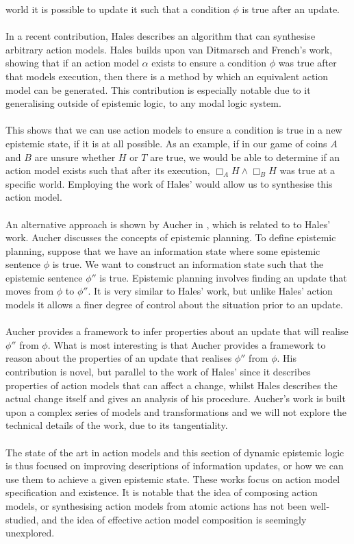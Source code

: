 world it is possible to update it such that a condition $\phi$ is true after an
update.\\
\\
In a recent contribution, Hales \cite{hales13synthesis} describes an algorithm that can synthesise arbitrary
action models.
Hales builds upon van Ditmarsch and French's work, showing that if an action
model $\alpha$ exists to ensure a condition $\phi$ was true after that models
execution, then there is a method by which an equivalent action model can be generated.
This contribution is especially notable due to it generalising outside of
epistemic logic, to any modal logic system.\\
\\
This shows that we can use action models to ensure a condition is true
in a new epistemic state, if it is at all possible.
As an example, if in our game of coins $A$ and $B$ are unsure whether $H$ or $T$
are true, we would be able to determine if an action model exists such that
after its execution, $\Box_A H \land \Box_B H$ was true at a
specific world.
Employing the work of Hales' would allow us to synthesise this action model.\\
\\
An alternative approach is shown by Aucher in
\cite{doi:10.3166/jancl.21.289-321,doi:10.1080/11663081.2012.736703}, which is related to
to Hales' work.
Aucher discusses the concepts of epistemic planning.
To define epistemic planning, suppose that we have an information state where
some epistemic sentence $\phi$ is true.
We want to construct an information state such that the epistemic sentence
$\phi''$ is true.
Epistemic planning involves finding an update that moves from $\phi$ to
$\phi''$.
It is very similar to Hales' work, but unlike Hales' action models it allows a
finer degree of control about the situation prior to an update.\\
\\
Aucher provides a framework to infer properties about an update that will
realise $\phi''$ from $\phi$.
What is most interesting is that Aucher provides a framework to reason about the
properties of an update that realises $\phi''$ from $\phi$.
His contribution is novel, but parallel to the work of Hales' since it describes
properties of action models that can affect a change, whilst Hales describes the actual change itself and gives
an analysis of his procedure.
Aucher's work is built upon a complex series of models and transformations and we will not explore
the technical details of the work, due to its tangentiality.\\
\\
The state of the art in action models and this section of dynamic epistemic
logic is thus focused on improving descriptions of information updates, or how
we can use them to achieve a given epistemic state.
These works focus on action model specification and existence.
It is notable that the idea of composing action models, or synthesising action models from atomic
actions has not been well-studied, and the idea of effective action model composition is seemingly
unexplored.

